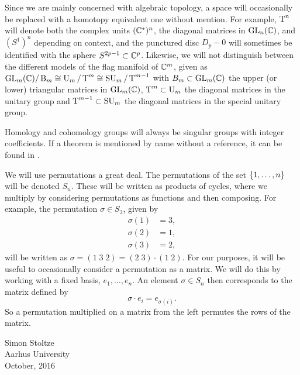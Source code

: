 Since we are mainly concerned with algebraic topology, a space will
occasionally be replaced with a homotopy equivalent one without
mention. For example, $\operatorname{T}^n$ will denote both the complex units
$(\mathbb{C}^*)^n$, the
diagonal matrices in $\operatorname{GL}_n(\mathbb{C})$, and $(S^1)^n$ depending
on context, and
the
punctured disc $D_p-0$ will sometimes be identified with the sphere
$S^{2p-1} \subset \mathbb{C}^p$. Likewise, we will not distinguish between the
different models of the flag manifold of $\mathbb{C}^m$, given as $\operatorname{GL}_{m}(\mathbb{C})/\operatorname{B}_{m}
\cong \operatorname{U}_{m}/\operatorname{T}^{m} \cong \operatorname{SU}_{m}/\operatorname{T}^{m-1}$ with $B_m \subset \operatorname{GL}_m(\mathbb{C})$ the upper (or
lower) triangular matrices in $\operatorname{GL}_m(\mathbb{C})$, $\operatorname{T}^m \subset \operatorname{U}_m$ the
diagonal
matrices in the unitary group and $\operatorname{T}^{m-1}\subset \operatorname{SU}_m$ the diagonal
matrices in the special unitary group.

Homology and cohomology groups will always be singular groups
with integer coefficients. If a theorem is mentioned by name without a
reference, it can be found in \cite{hatcher}.

We will use permutations a great deal. The permutations of the set
$\left\{ 1,\dots,n \right\}$ will be denoted $S_n$.
These will be written as products of cycles, where we multiply by
considering permutations as functions and then composing. For
example, the
permutation $\sigma\in S_3$, given by
\begin{align*}
  \sigma(1) &= 3, \\
  \sigma(2) &= 1, \\
  \sigma(3) &= 2,
\end{align*}
will be written as $\sigma = (1 \; 3 \; 2) = (2\; 3)\cdot (1\; 2)$.
For our purposes, it will be useful to occasionally consider
a permutation as a matrix. We will do this by working with a fixed
basis, $e_1,\dots,e_n$. An element $\sigma \in S_n$ then
corresponds to the matrix defined by
\[ \sigma \cdot e_i = e_{\sigma(i)}. \]
So a permutation multiplied on a matrix from the left permutes the
rows of the matrix.


\vfill
\begin{flushright}
  Simon Stoltze \\
  Aarhus University\\
  October, 2016
\end{flushright}




